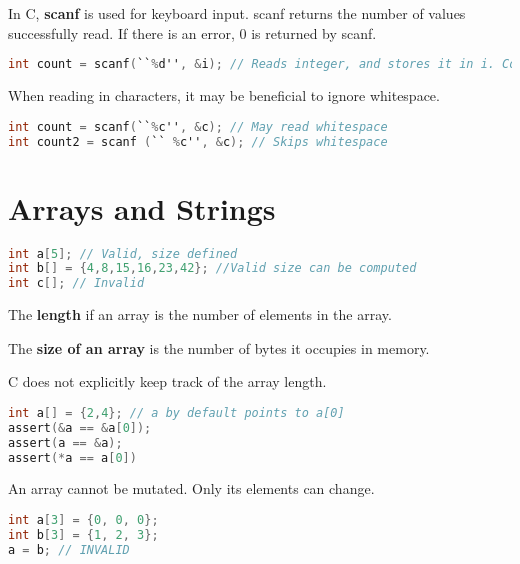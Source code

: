 \documentclass[english, 12pt]{article}
\begin{document}
\begin{defn}
In C, \textbf{scanf} is used for keyboard input. scanf returns the number of values successfully read. If there is an error, 0 is returned by scanf.
\begin{lstlisting}[language=C]
int count = scanf(``%d'', &i); // Reads integer, and stores it in i. Count should be 1.
\end{lstlisting}
\end{defn}
\begin{note}
When reading in characters, it may be beneficial to ignore whitespace.
\begin{lstlisting}[language=C]
int count = scanf(``%c'', &c); // May read whitespace
int count2 = scanf (`` %c'', &c); // Skips whitespace
\end{lstlisting}
\end{note}

\section{Arrays and Strings}

\begin{lstlisting}[language=C]
int a[5]; // Valid, size defined
int b[] = {4,8,15,16,23,42}; //Valid size can be computed
int c[]; // Invalid
\end{lstlisting}

\begin{defn}
The \textbf{length} if an array is the number of elements in the array.
\end{defn}

\begin{defn}
The \textbf{size of an array} is the number of bytes it occupies in memory.
\end{defn}

\begin{qte}
C does not explicitly keep track of the array length.
\end{qte}

\begin{lstlisting}[language=C]
int a[] = {2,4}; // a by default points to a[0]
assert(&a == &a[0]);
assert(a == &a);
assert(*a == a[0])
\end{lstlisting}

\begin{note}
An array cannot be mutated. Only its elements can change.
\begin{lstlisting}[language=C]
int a[3] = {0, 0, 0};
int b[3] = {1, 2, 3};
a = b; // INVALID
\end{lstlisting}
\end{note}
\end{document}
